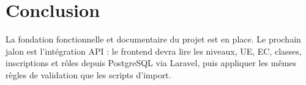\documentclass[11pt,a4paper]{article}
\begin{document}
\section{Conclusion}
La fondation fonctionnelle et documentaire du projet est en place. Le prochain jalon est l'intégration API : le frontend devra lire les niveaux, UE, EC, classes, inscriptions et rôles depuis PostgreSQL via Laravel, puis appliquer les mêmes règles de validation que les scripts d'import.
\end{document}
